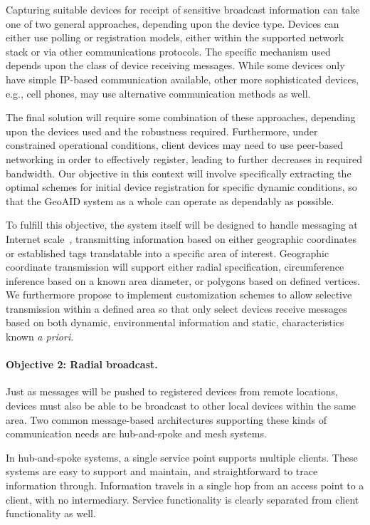\documentclass{sbir}
\begin{document}
Capturing suitable devices for receipt of sensitive broadcast information can take one of two general approaches, depending upon the device type. Devices can either use polling or registration models, either within the supported network stack or via other communications protocols. The specific mechanism used depends upon the class of device receiving messages. While some devices only have simple IP-based communication available, other more sophisticated devices, e.g., cell phones, may use alternative communication methods as well. 

The final solution will require some combination of these approaches, depending upon the devices used and the robustness required. Furthermore, under constrained operational conditions, client devices may need to use peer-based networking in order to effectively register, leading to further decreases in required bandwidth. Our objective in this context will involve specifically extracting the optimal schemes for initial device registration for specific dynamic conditions, so that the GeoAID system as a whole can operate as dependably as possible.

To fulfill this objective, the system itself will be designed to handle messaging at Internet scale~\cite{KrPaFrMa:12,LiPoClGePrNuRo:12,LlFrKaAn:11}, transmitting information based on either geographic coordinates or established tags translatable into a specific area of interest. Geographic coordinate transmission will support either radial specification, circumference inference based on a known area diameter, or polygons based on defined vertices. We furthermore propose to implement customization schemes to allow selective transmission within a defined area so that only select devices receive messages based on both dynamic, environmental information and static, characteristics known {\sl a priori}.

\paragraph{Objective 2: Radial broadcast.} Just as messages will be pushed to registered devices from remote locations, devices must also be able to be broadcast to other local devices within the same area. Two common message-based architectures supporting these kinds of communication needs are hub-and-spoke and mesh systems.

In hub-and-spoke systems, a single service point supports multiple clients. These systems are easy to support and maintain, and straightforward to trace information through. Information travels in a single hop from an access point to a client, with no intermediary. Service functionality is clearly separated from client functionality as well.
\end{document}
